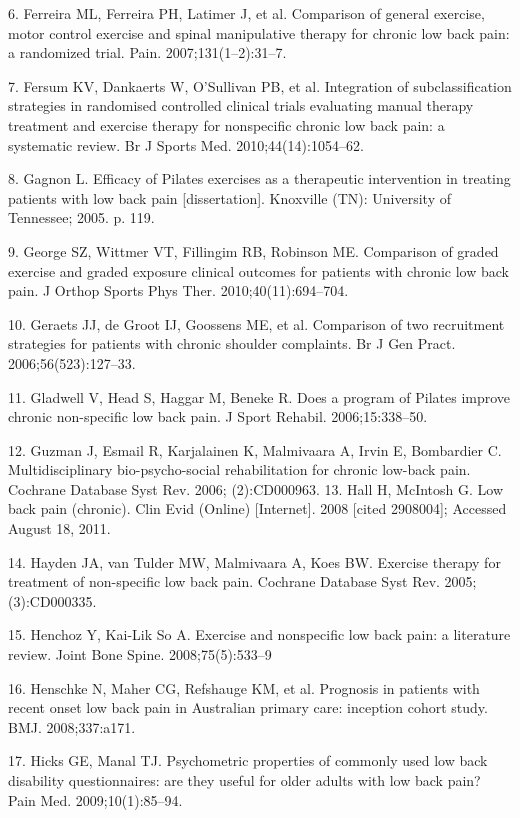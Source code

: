 \documentclass[a5paper]{article}
\theoremstyle{definition}
\begin{document}
6. Ferreira ML, Ferreira PH, Latimer J, et al. Comparison of general exercise, motor control exercise and spinal manipulative
therapy for chronic low back pain: a randomized trial. Pain.
2007;131(1–2):31–7.

7. Fersum KV, Dankaerts W, O’Sullivan PB, et al. Integration of
subclassification strategies in randomised controlled clinical trials
evaluating manual therapy treatment and exercise therapy for nonspecific chronic low back pain: a systematic review. Br J Sports
Med. 2010;44(14):1054–62.

8. Gagnon L. Efficacy of Pilates exercises as a therapeutic intervention in treating patients with low back pain [dissertation]. Knoxville (TN): University of Tennessee; 2005. p. 119.

9. George SZ, Wittmer VT, Fillingim RB, Robinson ME. Comparison of graded exercise and graded exposure clinical outcomes for
patients with chronic low back pain. J Orthop Sports Phys Ther.
2010;40(11):694–704.

10. Geraets JJ, de Groot IJ, Goossens ME, et al. Comparison of two
recruitment strategies for patients with chronic shoulder complaints. Br J Gen Pract. 2006;56(523):127–33.

11. Gladwell V, Head S, Haggar M, Beneke R. Does a program of
Pilates improve chronic non-specific low back pain. J Sport
Rehabil. 2006;15:338–50.

12. Guzman J, Esmail R, Karjalainen K, Malmivaara A, Irvin E,
Bombardier C. Multidisciplinary bio-psycho-social rehabilitation
for chronic low-back pain. Cochrane Database Syst Rev. 2006;
(2):CD000963.
13. Hall H, McIntosh G. Low back pain (chronic). Clin Evid (Online)
[Internet]. 2008 [cited 2908004]; Accessed August 18, 2011.

14. Hayden JA, van Tulder MW, Malmivaara A, Koes BW. Exercise
therapy for treatment of non-specific low back pain. Cochrane
Database Syst Rev. 2005;(3):CD000335.

15. Henchoz Y, Kai-Lik So A. Exercise and nonspecific low back
pain: a literature review. Joint Bone Spine. 2008;75(5):533–9


16. Henschke N, Maher CG, Refshauge KM, et al. Prognosis in
patients with recent onset low back pain in Australian primary
care: inception cohort study. BMJ. 2008;337:a171.

17. Hicks GE, Manal TJ. Psychometric properties of commonly used
low back disability questionnaires: are they useful for older adults
with low back pain? Pain Med. 2009;10(1):85–94.
\end{document}

